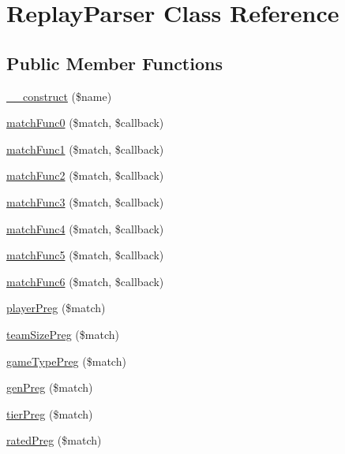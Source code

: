 \hypertarget{class_replay_parser}{}\section{Replay\+Parser Class Reference}
\label{class_replay_parser}
\subsection*{Public Member Functions}
\begin{DoxyCompactItemize}
\item 
\hyperlink{class_replay_parser_abcbfafc44c90244cafe255f1d8746b6c}{\+\_\+\+\_\+construct} (\$name)
\item 
\hyperlink{class_replay_parser_acd81b57421533d3bc9b27aa626656f03}{match\+Func0} (\$match, \$callback)
\item 
\hyperlink{class_replay_parser_aaeed5f1f75f5699b789c615382badb88}{match\+Func1} (\$match, \$callback)
\item 
\hyperlink{class_replay_parser_aeacf15eaec9b2286ec8d2f115da79dbc}{match\+Func2} (\$match, \$callback)
\item 
\hyperlink{class_replay_parser_acd7c392f18f3b3ad335de013cce3933a}{match\+Func3} (\$match, \$callback)
\item 
\hyperlink{class_replay_parser_ab801646e64e6b8ecac29ce7ee1747d25}{match\+Func4} (\$match, \$callback)
\item 
\hyperlink{class_replay_parser_a7bf96da9470293c55f2b660b06567c9c}{match\+Func5} (\$match, \$callback)
\item 
\hyperlink{class_replay_parser_ab7384088b81560523345788ccfcc18b7}{match\+Func6} (\$match, \$callback)
\item 
\hyperlink{class_replay_parser_aaf806767f8ce5255033e5f3a23498d07}{player\+Preg} (\$match)
\item 
\hyperlink{class_replay_parser_a46cb2149fb24bf3a9674c544caee3fcf}{team\+Size\+Preg} (\$match)
\item 
\hyperlink{class_replay_parser_abbcd249f3c369dc35386fc203bd7dc74}{game\+Type\+Preg} (\$match)
\item 
\hyperlink{class_replay_parser_a743e78021b6754ea36c804074e07da2d}{gen\+Preg} (\$match)
\item 
\hyperlink{class_replay_parser_a6dbfd4792430ea1e12ce6aa9b4397ba7}{tier\+Preg} (\$match)
\item 
\hyperlink{class_replay_parser_abde1f69b95e0b0f1960b92e79cc0ac46}{rated\+Preg} (\$match)
\item 

\end{DoxyCompactItemize}
